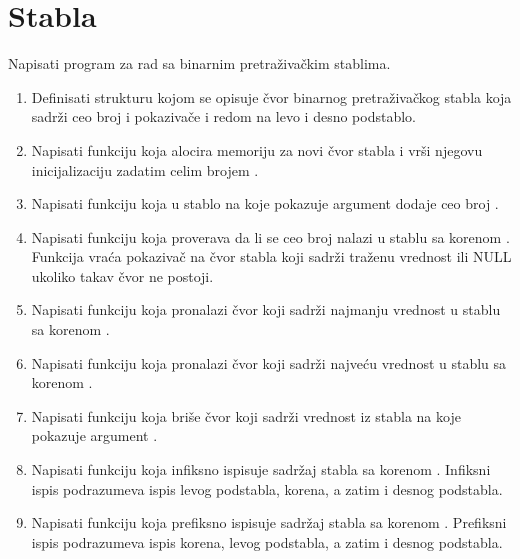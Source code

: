 \section{Stabla}

\begin{Exercise}[label=701]
Napisati program za rad sa binarnim pretraživačkim stablima.
\begin{enumerate}
\item Definisati strukturu  kojom se opisuje čvor binarnog pretraživačkog stabla koja sadrži ceo broj  i pokazivače  i  redom na levo i desno podstablo.

\item Napisati funkciju  koja alocira memoriju za novi čvor stabla i vrši njegovu inicijalizaciju zadatim celim brojem .

\item Napisati funkciju  koja u stablo na koje pokazuje argument  dodaje ceo broj .

\item Napisati funkciju  koja proverava da li se ceo broj  nalazi u stablu sa korenom . Funkcija vraća pokazivač na čvor stabla koji sadrži traženu vrednost ili NULL ukoliko takav čvor ne postoji.

\item Napisati funkciju  koja pronalazi čvor koji sadrži najmanju vrednost u stablu sa korenom . 

\item Napisati funkciju  koja pronalazi čvor koji sadrži najveću vrednost u stablu sa korenom .

\item Napisati funkciju  koja briše čvor koji sadrži vrednost  iz stabla na koje pokazuje argument .

\item Napisati funkciju  koja infiksno ispisuje sadržaj stabla sa korenom . Infiksni ispis podrazumeva ispis levog podstabla, korena, a zatim i desnog podstabla.

\item Napisati funkciju  koja prefiksno ispisuje sadržaj stabla sa korenom . Prefiksni ispis podrazumeva ispis korena, levog podstabla, a zatim i desnog podstabla.


\end{enumerate}
\end{Exercise}
